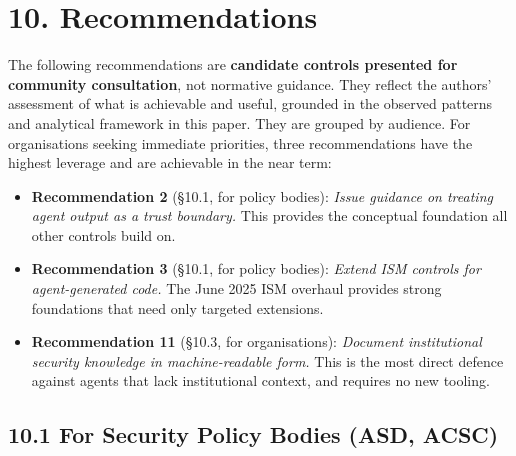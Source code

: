 \documentclass[a4paper,11pt]{report}
\providecommand{\tightlist}{%
  \setlength{\itemsep}{0pt}\setlength{\parskip}{0pt}}
\begin{document}
\hypertarget{recommendations}{%
\section{10. Recommendations}\label{recommendations}}

The following recommendations are \textbf{candidate controls presented
for community consultation}, not normative guidance. They reflect the
authors' assessment of what is achievable and useful, grounded in the
observed patterns and analytical framework in this paper. They are
grouped by audience. For organisations seeking immediate priorities,
three recommendations have the highest leverage and are achievable in
the near term:

\begin{itemize}
\tightlist
\item
  \textbf{Recommendation 2} (§10.1, for policy bodies): \emph{Issue
  guidance on treating agent output as a trust boundary.} This provides
  the conceptual foundation all other controls build on.
\item
  \textbf{Recommendation 3} (§10.1, for policy bodies): \emph{Extend ISM
  controls for agent-generated code.} The June 2025 ISM overhaul
  provides strong foundations that need only targeted extensions.
\item
  \textbf{Recommendation 11} (§10.3, for organisations): \emph{Document
  institutional security knowledge in machine-readable form.} This is
  the most direct defence against agents that lack institutional
  context, and requires no new tooling.
\end{itemize}

\hypertarget{for-security-policy-bodies-asd-acsc}{%
\subsection{10.1 For Security Policy Bodies (ASD,
ACSC)}\label{for-security-policy-bodies-asd-acsc}}
\end{document}
